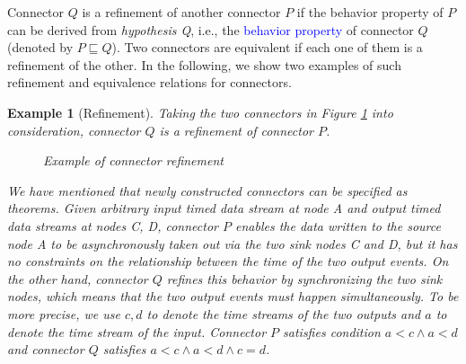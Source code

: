 \documentclass[preprint,3p]{elsarticle}
\newcommand{\liyi}[1]{\textcolor{blue}{#1}}
\newcommand{\xy}[1]{{#1}}
\newtheorem{example}{Example}[section]
\begin{document}
\xy{Connector $Q$ is a refinement of another connector $P$ if the behavior property of $P$ can
be derived from \emph{hypothesis Q}, i.e., the \liyi{behavior property} of connector $Q$ (denoted by $P \sqsubseteq Q$). Two connectors are equivalent if each one of them is a refinement of the other.}
In the following, we show two examples of such refinement and equivalence relations for connectors.

\begin{example}[Refinement]
\label{ex:refine}
Taking the two connectors in Figure \ref{refine} into consideration, connector $Q$ is a refinement of connector $P$.
\begin{figure}
\vspace{0cm}
\centering
{}
\caption{Example of connector refinement}
\label{refine}
\end{figure}

We have mentioned that newly constructed connectors can be specified as theorems. Given arbitrary input timed
data stream at node \emph{A} and output timed data streams at nodes \emph{C}, \emph{D},
connector $P$ enables the
data written to the source node \emph{A} to be asynchronously taken out via the two sink nodes \emph{C} and \emph{D}, but
it has no constraints on the relationship between the time of the two output events. On the other hand,
connector $Q$ refines this behavior by synchronizing the two sink nodes, which means that the two output
events must happen simultaneously. To be more precise, we use $c,d$ to denote the time streams of the two outputs
and $a$ to denote the time stream of the input. Connector $P$ satisfies condition $a<c\wedge a<d$ and
connector $Q$ satisfies $a<c\wedge a<d \wedge c=d$.
\end{example}
\end{document}
